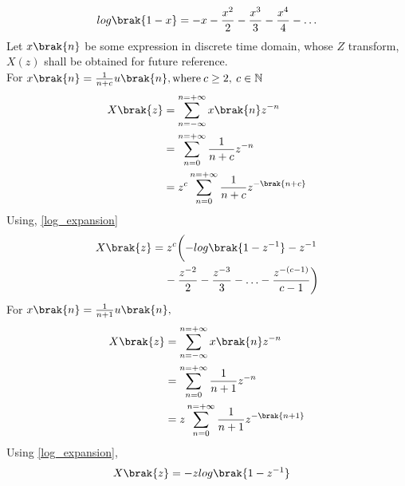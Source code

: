 \begin{align}
        log\brak{1-x} = -x - \frac{x^2}{2} - \frac{x^3}{3}-\frac{x^4}{4}- \ldots \label{log_expansion}
\end{align}
Let $x\brak{n}$ be some expression in discrete time domain, whose $Z$ transform, $X(z)$ shall be obtained for future reference.\\
For  $x\brak{n} = \frac{1}{n+c} u\brak{n},\text{where} \: c \geq 2,\: c \in \mathbb{N}$\\
\begin{align}
    X\brak{z} &= \sum_{n= -\infty}^{n= +\infty} x\brak{n}z^{-n}\\
    &=\sum_{n = 0}^{n = +\infty} \frac{1}{n+c}z^{-n}\\
    &= z^c\sum_{n = 0}^{n = +\infty} \frac{1}{n+c}z^{-\brak{n+c}} \\
\end{align}
Using, \eqref{log_expansion}\\
\begin{align}
    X\brak{z}&= z^c \biggl(-log\brak{1-z^{-1}}- z^{-1}\notag\\& \;\;\;\;-\frac{z^{-2}}{2}-\frac{z^{-3}}{3} - \ldots -\frac{z^{-(c-1)}}{c-1} \biggr)\label{11027_eq1}
\end{align} 
For $x\brak{n} = \frac{1}{n+1}u\brak{n},$\\
\begin{align}
	X\brak{z} &=\sum_{n= -\infty}^{n= +\infty} x\brak{n}z^{-n}\\
	&= \sum_{n = 0}^{n = +\infty} \frac{1}{n+1}z^{-n}\\
	&= z\sum_{n = 0}^{n = +\infty} \frac{1}{n+1}z^{-\brak{n+1}} \\
\end{align}
Using \eqref{log_expansion},\\
\begin{align}
	X\brak{z}&= -zlog\brak{1-z^{-1}} \label{When_c_equals_1}	
\end{align}
\newpage

